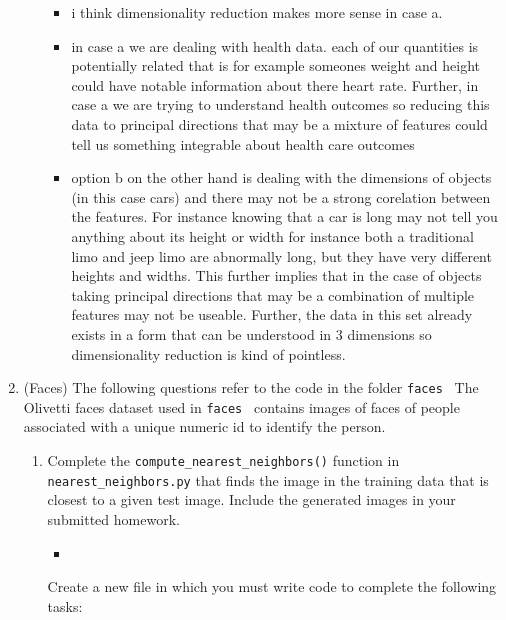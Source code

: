 \documentclass[12pt,twoside]{article}
\begin{document}
\begin{enumerate}
\begin{enumerate}
\begin{itemize}
  \color{blue}
  \item i think dimensionality reduction makes more sense in case a. 
  \item in case a we are dealing with health data. each of our quantities is potentially related
  that is for example someones weight and height could have notable information about there 
  heart rate. Further, in case a we are trying to understand health outcomes so reducing this 
  data to principal directions that may be a mixture of features could tell us something 
  integrable about health care outcomes 
  \item option b on the other hand is dealing with the dimensions of objects (in this case cars)
  and there may not be a strong corelation between the features. For instance 
  knowing that a car is long may not tell you anything about its height or width
  for instance both a traditional limo and jeep limo are abnormally long, but they have 
  very different heights and widths. This further implies that in the case of objects taking
  principal directions that may be a combination of multiple features may not be useable.
  Further, the data in this set already exists in a
  form that can be understood in 3 dimensions so dimensionality reduction is kind of pointless. 

\end{itemize}


\end{enumerate} 

\item (Faces) The following questions refer to the code in the folder {\tt faces }
  The Olivetti faces dataset used in  {\tt faces }  contains images of faces of people associated with a unique numeric id to identify the person.
 
\begin{enumerate}
\item  Complete the \verb|compute_nearest_neighbors()| function in \verb|nearest_neighbors.py| that finds the image in the training data that is closest to a given test image.  Include the generated images in your submitted homework.
\begin{itemize}
\item \inputminted[firstline=39, lastline=42, breaklines=True]{python}{hw9.py}


\end{itemize}


\vspace{0.5cm}Create a new file in which
you must write code to complete the following tasks:


\end{enumerate}
\end{enumerate}
\end{document}
